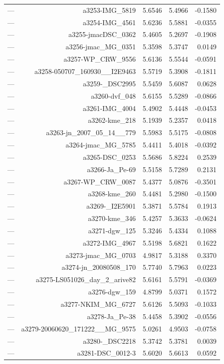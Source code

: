 \begin{table}[htbp]
\begin{tabular}{lrrrr}
— & a3253-IMG_5819 & 5.6546 & 5.4966 & -0.1580 \\
— & a3254-IMG_4561 & 5.6236 & 5.5881 & -0.0355 \\
— & a3255-jmacDSC_0362 & 5.4605 & 5.2697 & -0.1908 \\
— & a3256-jmac_MG_0351 & 5.3598 & 5.3747 & 0.0149 \\
— & a3257-WP_CRW_9556 & 5.6136 & 5.5544 & -0.0591 \\
— & a3258-050707_160930__I2E9463 & 5.5719 & 5.3908 & -0.1811 \\
— & a3259-_DSC2995 & 5.5459 & 5.6087 & 0.0628 \\
— & a3260-dvf_048 & 5.6155 & 5.5289 & -0.0866 \\
— & a3261-IMG_4004 & 5.4902 & 5.4448 & -0.0453 \\
— & a3262-kme_218 & 5.1939 & 5.2357 & 0.0418 \\
— & a3263-jn_2007_05_14__779 & 5.5983 & 5.5175 & -0.0808 \\
— & a3264-jmac_MG_5785 & 5.4411 & 5.4018 & -0.0392 \\
— & a3265-DSC_0253 & 5.5686 & 5.8224 & 0.2539 \\
— & a3266-Ja_Pe-69 & 5.5158 & 5.7289 & 0.2131 \\
— & a3267-WP_CRW_0087 & 5.4377 & 5.0876 & -0.3501 \\
— & a3268-kme_260 & 5.4481 & 5.2980 & -0.1500 \\
— & a3269-_I2E5901 & 5.3871 & 5.5784 & 0.1913 \\
— & a3270-kme_346 & 5.4257 & 5.3633 & -0.0624 \\
— & a3271-dgw_125 & 5.3246 & 5.4334 & 0.1088 \\
— & a3272-IMG_4967 & 5.5198 & 5.6821 & 0.1622 \\
— & a3273-jmac_MG_0703 & 4.9817 & 5.3188 & 0.3370 \\
— & a3274-jn_20080508_170 & 5.7740 & 5.7963 & 0.0223 \\
— & a3275-LS051026_day_2_arive82 & 5.6161 & 5.5791 & -0.0369 \\
— & a3276-dgw_159 & 4.8799 & 5.0371 & 0.1572 \\
— & a3277-NKIM_MG_6727 & 5.6126 & 5.5093 & -0.1033 \\
— & a3278-Ja_Pe-38 & 5.4458 & 5.3902 & -0.0556 \\
— & a3279-20060620_171222__MG_9575 & 5.0261 & 4.9503 & -0.0758 \\
— & a3280-_DSC2218 & 5.3742 & 5.3781 & 0.0039 \\
— & a3281-DSC_0012-3 & 5.6020 & 5.6613 & 0.0592 \\

\end{tabular}
\end{table}
